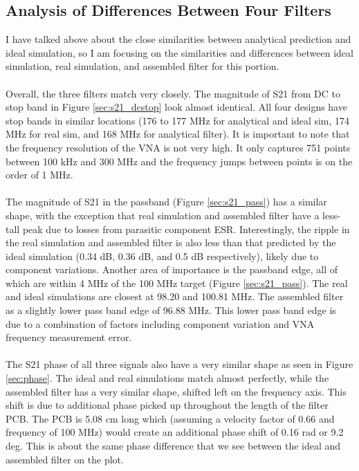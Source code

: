 \documentclass[letterpaper,12pt]{article}
\begin{document}
\subsection{Analysis of Differences Between Four Filters}
I have talked above about the close similarities between analytical prediction and ideal simulation, so I am focusing on the similarities and differences between ideal simulation, real simulation, and assembled filter for this portion.
\\
\\
Overall, the three filters match very closely. The magnitude of S21 from DC to stop band in Figure \ref{sec:s21_dcstop} look almost identical. All four designs have stop bands in similar locations (176 to 177 MHz for analytical and ideal sim, 174 MHz for real sim, and 168 MHz for analytical filter). It is important to note that the frequency resolution of the VNA is not very high. It only captures 751 points between 100 kHz and 300 MHz and the frequency jumps between points is on the order of 1 MHz.
\\
\\
The magnitude of S21 in the passband (Figure \ref{sec:s21_pass}) has a similar shape, with the exception that real simulation and assembled filter have a less-tall peak due to losses from parasitic component ESR. Interestingly, the ripple in the real simulation and assembled filter is also less than that predicted by the ideal simulation (0.34 dB, 0.36 dB, and 0.5 dB respectively), likely due to component variations. Another area of importance is the passband edge, all of which are within 4 MHz of the 100 MHz target (Figure \ref{sec:s21_pass}). The real and ideal simulations are closest at 98.20 and 100.81 MHz. The assembled filter as a slightly lower pass band edge of 96.88 MHz. This lower pass band edge is due to a combination of factors including component variation and VNA frequency measurement error.
\\
\\
The S21 phase of all three signals also have a very similar shape as seen in Figure \ref{sec:phase}. The ideal and real simulations match almost perfectly, while the assembled filter has a very similar shape, shifted left on the frequency axis. This shift is due to additional phase picked up throughout the length of the filter PCB. The PCB is 5.08 cm long which (assuming a velocity factor of 0.66 and frequency of 100 MHz) would create an additional phase shift of 0.16 rad or 9.2 deg. This is about the same phase difference that we see between the ideal and assembled filter on the plot.
\end{document}

